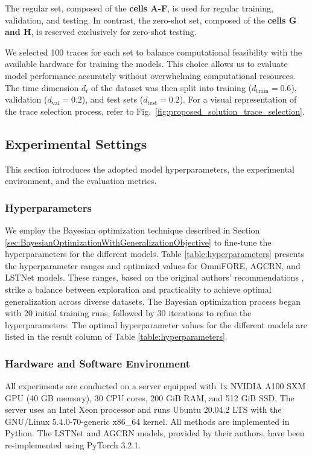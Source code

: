 \documentclass{ieeetmlcn}
\begin{document}
The regular set, composed of the \textbf{cells A-F}, is used for regular training, validation, and testing. In contrast, the zero-shot set, composed of the \textbf{cells G and H}, is reserved exclusively for zero-shot testing.

We selected 100 traces for each set to balance computational feasibility with the available hardware for training the models. This choice allows us to evaluate model performance accurately without overwhelming computational resources. The time dimension $d_t$ of the dataset was then split into training ($d_\text{train} = 0.6$), validation ($d_\text{val} = 0.2$), and test sets ($d_\text{test} = 0.2$). For a visual representation of the trace selection process, refer to Fig.~\ref{fig:proposed_solution_trace_selection}.

\subsection{Experimental Settings}
This section introduces the adopted model hyperparameters, the experimental environment, and the evaluation metrics.

\subsubsection{\textbf{Hyperparameters}}
We employ the Bayesian optimization technique described in Section \ref{sec:BayesianOptimizationWithGeneralizationObjective} to fine-tune the hyperparameters for the different models. Table \ref{table:hyperparameters} presents the hyperparameter ranges and optimized values for OmniFORE, AGCRN, and LSTNet models. These ranges, based on the original authors' recommendations \cite{AGCRN, LSTNet}, strike a balance between exploration and practicality to achieve optimal generalization across diverse datasets. The Bayesian optimization process began with 20 initial training runs, followed by 30 iterations to refine the hyperparameters. The optimal hyperparameter values for the different models are listed in the result column of Table \ref{table:hyperparameters}.

\subsubsection{\textbf{Hardware and Software Environment}}
All experiments are conducted on a server equipped with 1x NVIDIA A100 SXM GPU (40 GB memory), 30 CPU cores, 200 GiB RAM, and 512 GiB SSD. The server uses an Intel Xeon processor and runs Ubuntu 20.04.2 LTS with the GNU/Linux 5.4.0-70-generic x86\_64 kernel. All methods are implemented in Python. The LSTNet and AGCRN models, provided by their authors, have been re-implemented using PyTorch 3.2.1.
\end{document}
